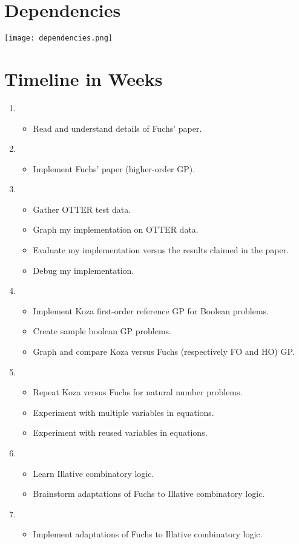 \documentclass{article}
\begin{document}
\section{Dependencies}

\texttt{[image: dependencies.png]}

\section{Timeline in Weeks}

\begin{enumerate}

\item
\begin{itemize}
\item Read and understand details of Fuchs' paper.
\end{itemize}

\item
\begin{itemize}
\item Implement Fuchs' paper (higher-order GP).
\end{itemize}

\item
\begin{itemize}
\item Gather OTTER test data.
\item Graph my implementation on OTTER data.
\item Evaluate my implementation versus the results claimed in the paper.
\item Debug my implementation.
\end{itemize}

\item
\begin{itemize}
\item Implement Koza first-order reference GP for Boolean problems.
\item Create sample boolean GP problems.
\item Graph and compare Koza versus Fuchs (respectively FO and HO) GP.
\end{itemize}

\item
\begin{itemize}
\item Repeat Koza versus Fuchs for natural number problems.
\item Experiment with multiple variables in equations.
\item Experiment with reused variables in equations.
\end{itemize}

\item
\begin{itemize}
\item Learn Illative combinatory logic.
\item Brainstorm adaptations of Fuchs to Illative combinatory logic.
\end{itemize}

\item
\begin{itemize}
\item Implement adaptations of Fuchs to Illative combinatory logic.
\end{itemize}

\end{enumerate}
\end{document}
